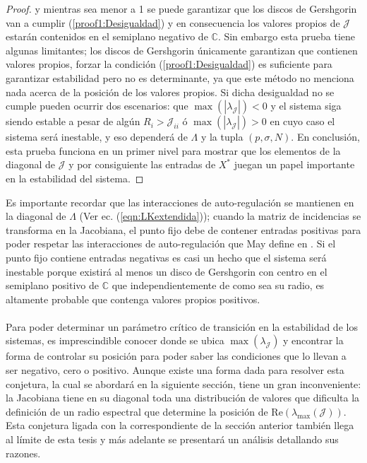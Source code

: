 \begin{proposición}
\begin{proof}
		y mientras sea menor a 1 se puede garantizar que los discos de Gershgorin van a cumplir (\ref{proof1:Desigualdad}) y en consecuencia los valores propios de $\mathcal{J}$ estarán contenidos en el semiplano negativo de $\mathbb{C}$. Sin embargo esta prueba tiene algunas limitantes; los discos de Gershgorin únicamente garantizan que contienen valores propios, forzar la condición (\ref{proof1:Desigualdad}) es suficiente para garantizar estabilidad pero no es determinante, ya que este método no menciona nada acerca de la posición de los valores propios. Si dicha desigualdad no se cumple pueden ocurrir dos escenarios: que $\max(|\lambda_\mathcal{J}|)<0$ y el sistema siga siendo estable a pesar de algún $R_i>\mathcal{J}_{ii}$ ó $\max(|\lambda_\mathcal{J}|)>0$ en cuyo caso el sistema será inestable, y eso dependerá de $\Lambda$ y la tupla $(p,\sigma,N)$. En conclusión, esta prueba funciona en un primer nivel para mostrar que los elementos de la diagonal de $\mathcal{J}$ y por consiguiente las entradas de $X^*$ juegan un papel importante en la estabilidad del sistema. 
	\end{proof}
\end{proposición}

Es importante recordar que las interacciones de auto-regulación se mantienen en la diagonal de $\Lambda$ (Ver ec. (\ref{eqn:LKextendida})); cuando la matriz de incidencias se transforma en la Jacobiana, el punto fijo debe de contener entradas positivas para poder respetar las interacciones de auto-regulación que May define en \cite{may1972will}. Si el punto fijo contiene entradas negativas es casi un hecho que el sistema será inestable porque existirá al menos un disco de Gershgorin con centro en el semiplano positivo de $\mathbb{C}$ que independientemente de como sea su radio, es altamente probable que contenga valores propios positivos.\\
\\
Para poder determinar un parámetro crítico de transición en la estabilidad de los sistemas, es imprescindible conocer donde se ubica $\max(\lambda_\mathcal{J})$ y encontrar la forma de controlar su posición para poder saber las condiciones que lo llevan a ser negativo, cero o positivo. Aunque existe una forma dada para resolver esta conjetura, la cual se abordará en la siguiente sección, tiene un gran inconveniente: la Jacobiana tiene en su diagonal toda una distribución de valores que dificulta la definición de un radio espectral que determine la posición de Re$(\lambda_{\max}(\mathcal{J}))$. Esta conjetura ligada con la correspondiente de la sección anterior también llega al límite de esta tesis y más adelante se presentará un análisis detallando sus razones.
\newpage
